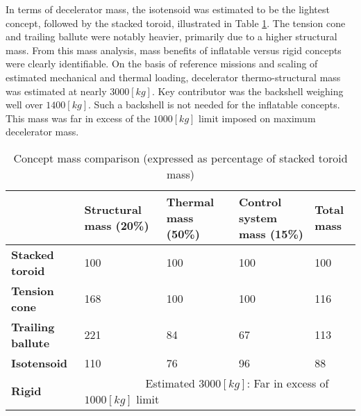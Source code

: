 In terms of decelerator mass, the isotensoid was estimated to be the lightest concept, followed by the stacked toroid, illustrated in Table \ref{tab:cmass}. The tension cone and trailing ballute were notably heavier, primarily due to a higher structural mass. From this mass analysis, mass benefits of inflatable versus rigid concepts were clearly identifiable. On the basis of reference missions and scaling of estimated mechanical and thermal loading, decelerator thermo-structural mass was estimated at nearly $3000 \left[kg\right]$. Key contributor was the backshell weighing well over $1400 \left[kg\right]$. Such a backshell is not needed for the inflatable concepts. This mass was far in excess of the $1000 \left[kg\right]$ limit imposed on maximum decelerator mass.

\begin{table}[h]
\centering
\caption[Concept mass comparison]{Concept mass comparison (expressed as percentage of stacked toroid mass)}\label{tab:cmass}
\begin{tabular}{|p{}|p{}|p{}|p{}||p{}|}

\hline
                          & \textbf{Structural mass (20\%)} & \textbf{Thermal mass (50\%)} & \textbf{Control system mass (15\%)} & \textbf{Total mass} \\ \hline
\textbf{Stacked toroid}   &  100                                 & 100                          & 100                                      &\cellcolor{green!70}  100                           \\ \hline
\textbf{Tension cone}     &  168                               & 100                               &  100                                     &\cellcolor{yellow!70} 116                                 \\ \hline
\textbf{Trailing ballute} &  221                                 & 84                               & 67                                      &\cellcolor{yellow!70} 113 \\ \hline
\textbf{Isotensoid}       &  110                                 & 76                               & 96                                      &\cellcolor{green!70} 88 \\ \hline \hline
\textbf{Rigid}            &  \multicolumn{4}{p{0.736\textwidth}|}{\cellcolor{red!60} ~~~~~~~~~~~Estimated $3000 \left[kg\right]$: Far in excess of $1000 \left[kg\right]$ limit}    \\ \hline
\end{tabular}
\end{table}

